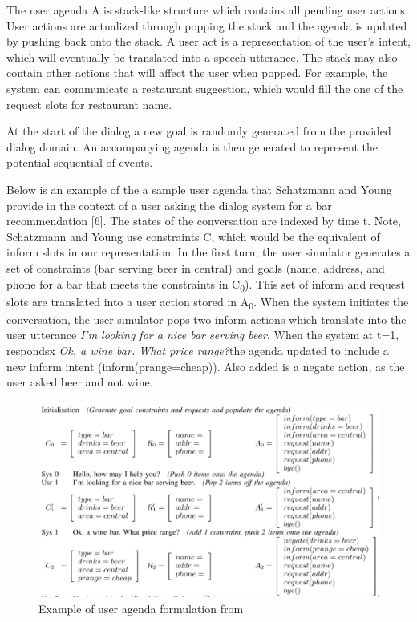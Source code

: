 The user agenda A is stack-like structure which contains all pending user actions. User actions are actualized through popping the stack and the agenda is updated by pushing back onto the stack. A user act is a representation of the user’s intent, which will eventually be translated into a speech utterance. The stack may also contain other actions that will affect the user when popped. For example, the system can communicate a restaurant suggestion, which would fill the one of the request slots for restaurant name.  

At the start of the dialog a new goal is randomly generated from the provided dialog domain. An accompanying agenda is then generated to represent the potential sequential of events. 

Below is an  example of the a sample user agenda that Schatzmann and Young provide in the context of a user asking the dialog system for a bar recommendation [6]. The states of the conversation are indexed by time t. Note, Schatzmann and Young use constraints C, which would be the equivalent of inform slots in our representation. In the first turn, the user simulator generates a set of constraints (bar serving beer in central) and goals (name, address, and phone for a bar that meets the constraints in C\textsubscript{0}). This set of inform and request slots are translated into a user action stored in A\textsubscript{0}. When the system initiates the conversation, the user simulator pops two inform actions which translate into the user utterance \textit{I’m looking for a nice bar serving beer}. When the system at t=1, respondsx \textit{Ok, a wine bar. What price range?}the agenda updated to include a new inform intent (inform(prange=cheap)). Also added is a negate action, as the user asked beer and not wine. 

\begin{figure}[h!]
	\centering
	\includegraphics[scale=.25]{diagrams/ageda_ex2.jpeg}
	\caption{ Example of user agenda formulation from \cite{Schatzmann2009TheHA} }
	\label{fig:speaker_class}
\end{figure}

